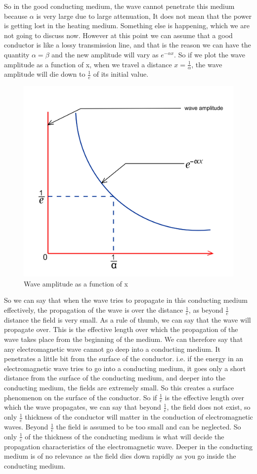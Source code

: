 So in the good conducting medium, the wave cannot penetrate this medium because $\alpha$ is very large due to large attenuation, It does not mean that the power is getting lost in the heating medium. Something else is happening, which we are not going to discuss now. However at this point we can assume that a good conductor is like a lossy transmission line, and that is the reason we can have the quantity $\alpha=\beta$ and the new amplitude will vary as $e^{-\alpha x}$. So if we plot the wave amplitude as a function of x, when we travel a distance $x=\frac{1}{\alpha}$, the wave amplitude will die down to $\frac{1}{e}$ of its initial value.
\begin{figure}[h]
\centering
\includegraphics[width=0.7\linewidth]{./graphics/Bello261}
\caption{Wave amplitude as a function of x}
\label{fig:bello261}
\end{figure}

So we can say that when the wave tries to propagate in this conducting medium effectively, the propagation of the wave is over the distance $\frac{1}{e}$, as beyond $\frac{1}{e}$ distance the field is very small. As a rule of thumb, we can say that the wave will propagate over. This is the effective length over which the propagation of the wave takes place from the beginning of the medium. We can therefore say that any electromagnetic wave cannot go deep into a conducting medium. It penetrates a little bit from the surface of the conductor. i.e. if the energy in an electromagnetic wave tries to go into a conducting medium, it goes only a short distance from the surface of the conducting medium, and deeper into the conducting medium, the fields are extremely small. So this creates a surface phenomenon on the surface of the conductor. So if $\frac{1}{e}$  is the effective length over which the wave propagates, we can say that beyond $\frac{1}{e}$, the field does not exist, so only $\frac{1}{e}$ thickness of the conductor will matter in the conduction of electromagnetic waves. Beyond $\frac{1}{e}$  the field is assumed to be too small and can be neglected. So only $\frac{1}{e}$ of the thickness of the conducting medium is what will decide the propagation characteristics of the electromagnetic wave. Deeper in the conducting medium is of no relevance as the field dies down rapidly as you go inside the conducting medium.

